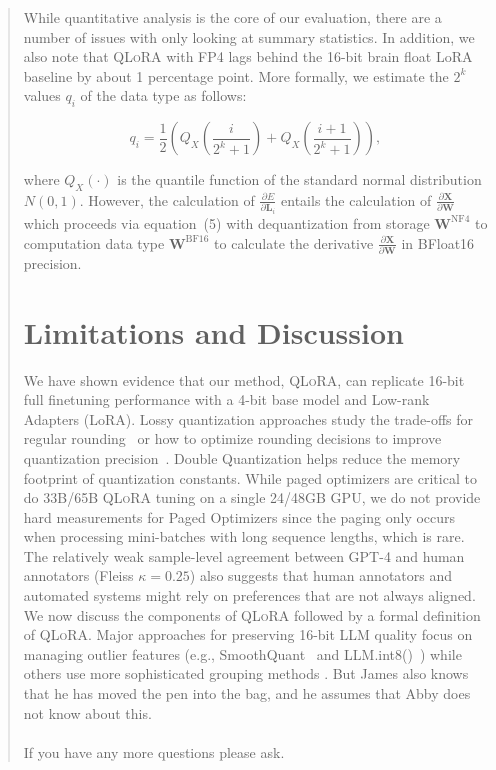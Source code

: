 {\begin{quote}
{While quantitative analysis is the core of our evaluation, there are a number of issues with only looking at summary statistics. In addition, we also note that \textsc{QLoRA} with FP4 lags behind the 16-bit brain float LoRA baseline by about 1 percentage point. More formally, we estimate the $2^k$ values $q_i$ of the data type as follows:

\begin{equation}
q_i  = \frac{1}{2}\left( Q_X\left(\frac{i}{2^k+1}\right) + Q_X\left(\frac{i+1}{2^k+1}\right)\right),
\end{equation}

where $Q_X(\cdot)$ is the quantile function of the standard normal distribution $N(0,1)$. However, the calculation of $\frac{\partial E}{\partial \mathbf{L}_i}$ entails the calculation of $\frac{\partial \mathbf{X}}{\partial \mathbf{W}}$ which proceeds via equation~(5) with dequantization from storage $\mathbf{W}^{\text{NF4}}$ to computation data type $\mathbf{W}^{\text{BF16}}$ to calculate the derivative $\frac{\partial \mathbf{X}}{\partial \mathbf{W}}$ in BFloat16 precision. \section{Limitations and Discussion}

We have shown evidence that our method, \textsc{QLoRA}, can replicate 16-bit full finetuning performance with a 4-bit base model and Low-rank Adapters (LoRA). Lossy quantization approaches study the trade-offs for regular rounding~\citep{dettmers2022case,zeng2022glm,pope2022efficiently} or how to optimize rounding decisions to improve quantization precision~\citep{frantar2022gptq}. Double Quantization helps reduce the memory footprint of quantization constants. While paged optimizers are critical to do 33B/65B \textsc{QLoRA} tuning on a single 24/48GB GPU, we do not provide hard measurements for Paged Optimizers since the paging only occurs when processing mini-batches with long sequence lengths, which is rare. The relatively weak sample-level agreement between GPT-4 and human annotators (Fleiss $\kappa=0.25$) also suggests that human annotators and automated systems might rely on preferences that are not always aligned. We now discuss the components of \textsc{QLoRA} followed by a formal definition of \textsc{QLoRA}. Major approaches for preserving 16-bit LLM quality focus on managing outlier features (e.g., SmoothQuant~\citep{xiao2022smoothquant} and LLM.int8()~\citep{dettmers2022llm}) while others use more sophisticated grouping methods \citep{park2022nuqmm, yao2022zeroquant}. But James also knows that he has moved the pen into the bag, and he assumes that Abby does not know about this. \\ \\ If you have any more questions please ask.}
\end{quote}

}
